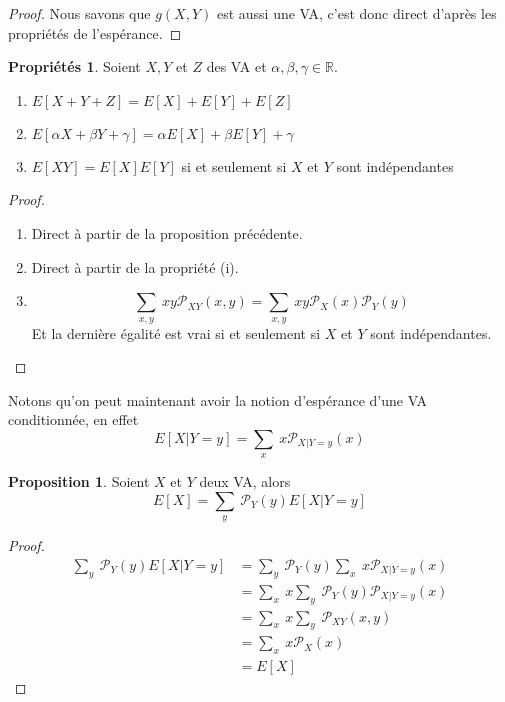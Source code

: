 \documentclass[a4paper,12pt]{report}
\theoremstyle{definition}
\newcommand{\R}{\mathbb{R}}
\renewcommand{\(}{\left(}
\renewcommand{\)}{\right)}
\renewcommand{\P}{\mathcal{P}}
\newtheorem{prop}[thm]{Proposition}
\newtheorem{propri}[thm]{Propriétés}
\begin{document}
        \begin{proof}
            Nous savons que $g(X,Y)$ est aussi une VA, c'est donc direct d'après les propriétés de l'espérance.
        \end{proof}
        
        \begin{propri}
            Soient $X,Y$ et $Z$ des VA et $\alpha, \beta,\gamma\in\R$.
            \begin{enumerate}[label = (\roman*)]
                \item $E[X+Y+Z]=E[X]+E[Y]+E[Z]$
                \item $E[\alpha X+\beta Y +\gamma] = \alpha E[X]+\beta E[Y]+\gamma$
                \item $E[XY] = E[X]E[Y]$ si et seulement si $X$ et $Y$ sont indépendantes
            \end{enumerate}
        \end{propri}
        
        \begin{proof}
            ${}$
            \begin{enumerate}[label = (\roman*)]
                \item Direct à partir de la proposition précédente.
                \item Direct à partir de la propriété (i).
                \item $$\sum_{x,y}~ xy\P_{XY}(x,y)=\sum_{x,y}~xy\P_X(x)\P_Y(y)$$
                Et la dernière égalité est vrai si et seulement si $X$ et $Y$ sont indépendantes.
            \end{enumerate}
        \end{proof}
        
        Notons qu'on peut maintenant avoir la notion d'espérance d'une VA conditionnée, en effet
        $$E[X|Y=y] = \sum_x~x\P_{X|Y=y}(x)$$
        
        \begin{leftbar}
        \begin{prop}
            Soient $X$ et $Y$ deux VA, alors
            $$E[X]=\sum_y~\P_Y(y)E[X|Y=y]$$
        \end{prop}
        \end{leftbar}
        
        \begin{proof}
            \begin{align*}
                \sum_y~\P_Y(y)E[X|Y=y] &= \sum_y~\P_Y(y)\sum_x~x\P_{X|Y=y}(x) \\
                &= \sum_x~x\sum_y~\P_Y(y)\P_{X|Y=y}(x) \\
                &= \sum_x~x\sum_y~\P_{XY}(x,y) \\
                &= \sum_x~x\P_X(x) \\
                &= E[X]
            \end{align*}
        \end{proof}
        
\end{document}
